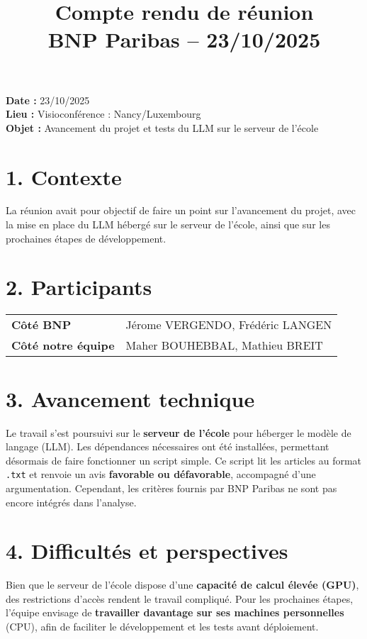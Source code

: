 \documentclass[a4paper,11pt]{article}
\title{\LARGE Compte rendu de réunion \\ \large BNP Paribas – 23/10/2025}
\date{}
\begin{document}
\maketitle

\begin{tcolorbox}[colback=blue!5!white,colframe=blue!75!black,title=Informations générales]
\textbf{Date :} 23/10/2025 \\
\textbf{Lieu :} Visioconférence : Nancy/Luxembourg \\
\textbf{Objet :} Avancement du projet et tests du LLM sur le serveur de l’école
\end{tcolorbox}

\vspace{0.5cm}

\section*{1. Contexte}
La réunion avait pour objectif de faire un point sur l’avancement du projet, avec la mise en place du LLM hébergé sur le serveur de l’école, ainsi que sur les prochaines étapes de développement.

\section*{2. Participants}
\begin{tcolorbox}[colback=gray!5!white,colframe=black!75!black,title=Participants]
\begin{tabular}{>{\bfseries}l l}
Côté BNP & Jérome VERGENDO, Frédéric LANGEN \\
Côté notre équipe & Maher BOUHEBBAL, Mathieu BREIT
\end{tabular}
\end{tcolorbox}

\section*{3. Avancement technique}
Le travail s’est poursuivi sur le \textbf{serveur de l’école} pour héberger le modèle de langage (LLM).  
Les dépendances nécessaires ont été installées, permettant désormais de faire fonctionner un script simple.  
Ce script lit les articles au format \texttt{.txt} et renvoie un avis \textbf{favorable ou défavorable}, accompagné d’une argumentation.  
Cependant, les critères fournis par BNP Paribas ne sont pas encore intégrés dans l’analyse.

\section*{4. Difficultés et perspectives}
Bien que le serveur de l’école dispose d’une \textbf{capacité de calcul élevée (GPU)}, des restrictions d’accès rendent le travail compliqué.  
Pour les prochaines étapes, l’équipe envisage de \textbf{travailler davantage sur ses machines personnelles} (CPU), afin de faciliter le développement et les tests avant déploiement.
\end{document}
